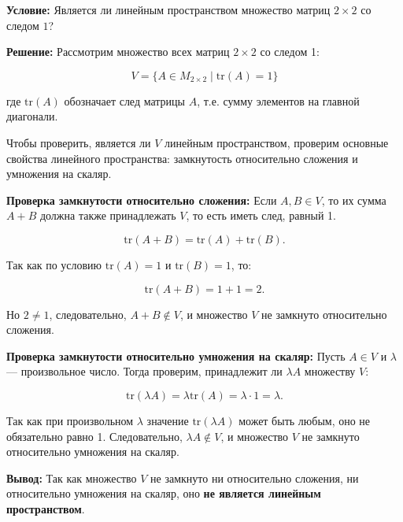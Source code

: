 \textbf{Условие:}
Является ли линейным пространством множество матриц \( 2 \times 2 \) со следом \( 1 \)?

\textbf{Решение:}
Рассмотрим множество всех матриц \( 2 \times 2 \) со следом 1:

\[
V = \{ A \in M_{2 \times 2} \mid \text{tr}(A) = 1 \}
\]

где \( \text{tr}(A) \) обозначает след матрицы \( A \), т.е. сумму элементов на главной диагонали.

Чтобы проверить, является ли \( V \) линейным пространством, проверим основные свойства линейного пространства: замкнутость относительно сложения и умножения на скаляр.

\textbf{Проверка замкнутости относительно сложения:}  
Если \( A, B \in V \), то их сумма \( A + B \) должна также принадлежать \( V \), то есть иметь след, равный 1.

\[
\text{tr}(A + B) = \text{tr}(A) + \text{tr}(B).
\]

Так как по условию \( \text{tr}(A) = 1 \) и \( \text{tr}(B) = 1 \), то:

\[
\text{tr}(A + B) = 1 + 1 = 2.
\]

Но \( 2 \neq 1 \), следовательно, \( A + B \notin V \), и множество \( V \) не замкнуто относительно сложения.

\textbf{Проверка замкнутости относительно умножения на скаляр:}  
Пусть \( A \in V \) и \( \lambda \) — произвольное число. Тогда проверим, принадлежит ли \( \lambda A \) множеству \( V \):

\[
\text{tr}(\lambda A) = \lambda \text{tr}(A) = \lambda \cdot 1 = \lambda.
\]

Так как при произвольном \( \lambda \) значение \( \text{tr}(\lambda A) \) может быть любым, оно не обязательно равно 1. Следовательно, \( \lambda A \notin V \), и множество \( V \) не замкнуто относительно умножения на скаляр.

\textbf{Вывод:}  
Так как множество \( V \) не замкнуто ни относительно сложения, ни относительно умножения на скаляр, оно \textbf{не является линейным пространством}.

